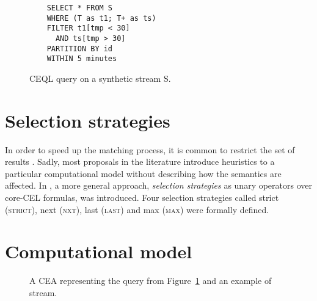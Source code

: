 \begin{figure}[H]
  \begin{verbatim}
    SELECT * FROM S
    WHERE (T as t1; T+ as ts)
    FILTER t1[tmp < 30]
      AND ts[tmp > 30]
    PARTITION BY id
    WITHIN 5 minutes
  \end{verbatim}
  \caption{CEQL query on a synthetic stream S.}
  \label{fig:query:ab+}
\end{figure}

\section{Selection strategies}\label{sec:selection_strategies}

In order to speed up the matching process, it is common to restrict the set of results \cite{selection-strategies-literature-1,selection-strategies-literature-2,selection-strategies-literature-3}. Sadly, most proposals in the literature introduce heuristics to a particular computational model without describing how the semantics are affected. In \cite{formal-framework-cer}, a more general approach, \emph{selection strategies} as unary operators over core-CEL formulas, was introduced. Four selection strategies called strict (\textsc{strict}), next (\textsc{nxt}), last (\textsc{last}) and max (\textsc{max}) were formally defined.

\section{Computational model}\label{sec:cea}

\begin{figure}[H]
  \centering
  \begin{subfigure}[b]{\textwidth}
    \centering
    \vspace*{2em}
  \end{subfigure}
  \begin{subfigure}[t]{\textwidth}
    \centering
  \end{subfigure}

  \caption{A CEA representing the query from Figure~\ref{fig:query:ab+} and an example of stream.}
  \label{fig:cea:ab+}
\end{figure}
